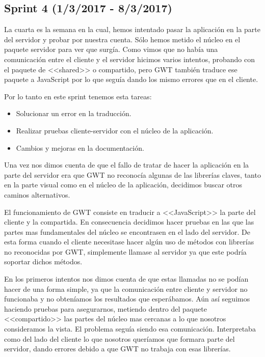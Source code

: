 \subsection{Sprint 4 (1/3/2017 - 8/3/2017)}
La cuarta es la semana en la cual, hemos intentado pasar la aplicación en la parte del servidor y probar por nuestra cuenta. Sólo hemos metido el núcleo en el paquete servidor para ver que surgía. Como vimos que no había una comunicación entre el cliente y el servidor hicimos varios intentos, probando con el paquete de <<shared>> o compartido, pero GWT también traduce ese paquete a JavaScript por lo que seguía dando los mismo errores que en el cliente.

Por lo tanto en este sprint tenemos esta tareas:

\begin{itemize}
\item Solucionar un error en la traducción.
\item Realizar pruebas cliente-servidor con el núcleo de la aplicación.
\item Cambios y mejoras en la documentación.
\end{itemize}

Una vez nos dimos cuenta de que el fallo de tratar de hacer la aplicación en la parte del servidor era que GWT no reconocía algunas de las librerías claves, tanto en la parte visual como en el núcleo de la aplicación, decidimos buscar otros caminos alternativos. 

El funcionamiento de GWT consiste en traducir a <<JavaScript>> la parte del cliente y la compartida. En consecuencia decidimos hacer pruebas en las que las partes mas fundamentales del núcleo se encontrasen en el lado del servidor. De esta forma cuando el cliente necesitase hacer algún uso de métodos con librerías no reconocidas por GWT, simplemente llamase al servidor ya que este podría soportar dichos métodos. 

En los primeros intentos nos dimos cuenta de que estas llamadas no se podían hacer de una forma simple, ya que la comunicación entre cliente y servidor no funcionaba y no obteníamos los resultados que esperábamos. Aún así seguimos haciendo pruebas para asegurarnos, metiendo dentro del paquete <<compartido>> las partes del núcleo mas cercanas a lo que nosotros consideramos la vista. El problema seguía siendo esa comunicación. Interpretaba como del lado del cliente lo que nosotros queríamos que formara parte del servidor, dando errores debido a que GWT no trabaja con esas librerías.

